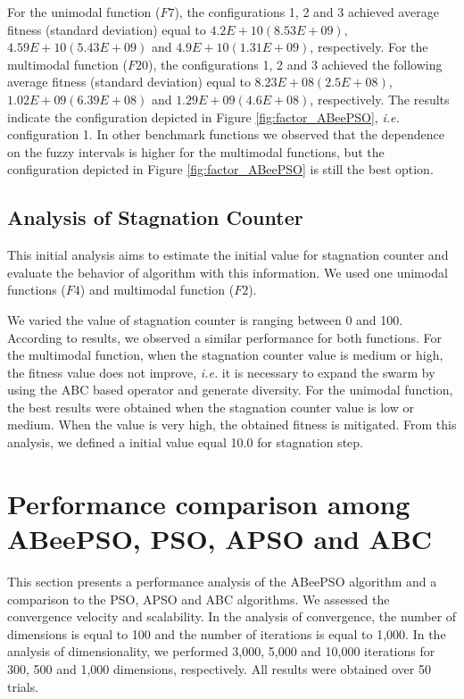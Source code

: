 For the unimodal function ($F7$), the configurations 1, 2 and 3 achieved average fitness (standard deviation) equal to $4.2E+10(8.53E+09)$, $4.59E+10(5.43E+09)$ and $4.9E+10(1.31E+09)$, respectively. For the multimodal function ($F20$), the configurations 1, 2 and 3 achieved the following average fitness (standard deviation) equal to $8.23E+08(2.5E+08)$, $1.02E+09(6.39E+08)$ and $1.29E+09(4.6E+08)$, respectively. The results indicate the configuration depicted in Figure \ref{fig:factor_ABeePSO}, \textit{i.e.} configuration 1. In other benchmark functions we observed that the dependence on the fuzzy intervals is higher for the multimodal functions, but the configuration depicted in Figure \ref{fig:factor_ABeePSO} is still the best option.

\subsection{Analysis of Stagnation Counter}
This initial analysis aims to estimate the initial value for stagnation counter and evaluate the behavior of algorithm with this information. We used one unimodal functions ($F4$) and multimodal function ($F2$).

We varied the value of stagnation counter is ranging between 0 and 100. According to results, we observed a similar performance for both functions. For the multimodal function, when the stagnation counter value is medium or high, the fitness value does not improve, \textit{i.e.} it is necessary to expand the swarm by using the ABC based operator and generate diversity. For the unimodal function, the best results were obtained when the stagnation counter value is low or medium. When the value is very high, the obtained fitness is mitigated. From this analysis, we defined a initial value equal 10.0 for stagnation step.


\section{Performance comparison among ABeePSO, PSO, APSO and ABC}
This section presents a performance analysis of the ABeePSO algorithm and a comparison to the  PSO, APSO and ABC algorithms. We assessed the convergence velocity and scalability.
In the analysis of convergence, the number of dimensions is equal to 100 and the number of iterations is equal to 1,000. In the analysis of dimensionality, we performed 3,000, 5,000 and 10,000 iterations for 300, 500 and 1,000 dimensions, respectively. All results were obtained over 50 trials.

